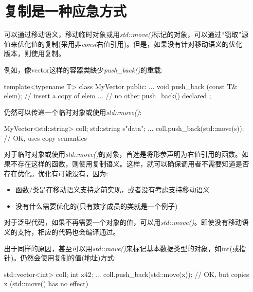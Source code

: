 \section{复制是一种应急方式}
可以通过移动语义，移动临时对象或用\textit{std::move()}标记的对象，可以通过“窃取”源值来优化值的复制(采用非\textit{const}右值引用)。但是，如果没有针对移动语义的优化版本，则使用复制。

例如，像vector这样的容器类缺少\textit{push_back()}的重载:

\begin{cppcode}
template<typename T>
class MyVector {
	public:
	...
	void push_back (const T& elem); // insert a copy of elem
	... // no other push_back() declared
};
\end{cppcode}

仍然可以传递一个临时对象或使用\textit{std::move()}:

\begin{cppcode}
MyVector<std::string> coll;
std::string s{"data"};
...
coll.push_back(std::move(s)); // OK, uses copy semantics
\end{cppcode}

对于临时对象或使用\textit{std::move()}的对象，首选是将形参声明为右值引用的函数。如果不存在这样的函数，则使用复制语义。这样，就可以确保调用者不需要知道是否存在优化。优化有可能没有，因为:


\begin{itemize}
	\item 函数/类是在移动语义支持之前实现，或者没有考虑支持移动语义
	\item 没有什么需要优化的(只有数字成员的类就是一个例子)
\end{itemize}

对于泛型代码，如果不再需要一个对象的值，可以用\textit{std::move()}。即使没有移动语义的支持，相应的代码也会编译通过。


出于同样的原因，甚至可以用\textit{std::move()}来标记基本数据类型的对象，如int(或指针)。仍然会使用复制的值(地址)方式:


\begin{cppcode}
std::vector<int> coll;
int x{42};
...
coll.push_back(std::move(x)); // OK, but copies x (std::move() has no effect)
\end{cppcode}


	